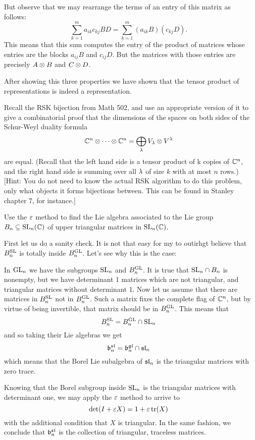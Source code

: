 \documentclass[12pt]{memoir}
\begin{document}
\begin{ptcbr}
    But observe that we may rearrange the terms of an entry of this matrix as follows: 
    $$\sum_{k=1}^{m}a_{ik}c_{kj}BD=\sum_{k=1}^{m}(a_{ik}B)(c_{kj}D).$$
    This means that this sum computes the entry of the product of matrices whose entries are the blocks $a_{ij}B$ and $c_{ij}D$. But the matrices with those entries are precisely $A\otimes B$ and $C\otimes D$.\par
    After showing this three properties we have shown that the tensor product of representations is indeed a representation. 
\end{ptcbr}
\begin{Ej}
    Recall the RSK bijection from Math 502, and use an appropriate version of it to give a combinatorial proof that the dimensions of the spaces on both sides of the Schur-Weyl duality formula
    $$\mathbb{C}^n\otimes\cdots\otimes\mathbb{C}^n=\bigoplus_\lambda V_\lambda\otimes V^\lambda$$
    are equal. (Recall that the left hand side is a tensor product of k copies of $\mathbb{C}^n$, and the right hand side
    is summing over all $\lambda$ of size $k$ with at most $n$ rows.)
    [Hint: You do not need to know the actual RSK algorithm to do this problem, only what objects it
    forms bijections between. This can be found in Stanley chapter 7, for instance.]
\end{Ej}

\begin{Ej}
    Use the $\varepsilon$ method to ﬁnd the Lie algebra associated to the Lie group $B_n\subseteq\mathrm{SL}_n(\mathbb{C})$ of upper
triangular matrices in $\mathrm{SL}_n(\mathbb{C})$.
\end{Ej}

\begin{ptcbr}
    First let us do a sanity check. It is not that easy for my to outirhgt believe that $B^{\mathrm{SL}}_n$ is totally inside $B^{\mathrm{GL}}_n$. Let's see why this is the case:\par
    In $\mathrm{GL}_n$ we have the subgroups $\mathrm{SL}_n$ and $B_n^{\mathrm{GL}}$. It is true that $\mathrm{SL}_n\cap B_n$ is nonempty, but we have determinant 1 matrices which are not triangular, and triangular matrices without determinant 1. Now let us assume that there are matrices in $B^{\mathrm{SL}}_n$ not in $B^{\mathrm{GL}}_n$. Such a matrix fixes the complete flag of $\mathbb{C}^n$, but by virtue of being invertible, that matrix should be in $B^{\mathrm{GL}}_n$. This means that 
    $$B^{\mathrm{SL}}_n=B^{\mathrm{GL}}_n\cap\mathrm{SL}_n$$ 
    and so taking their Lie algebras we get 
    $$\mathfrak{b}^{\mathfrak{sl}}_n=\mathfrak{b}^{\mathfrak{gl}}_n\cap\mathfrak{sl}_n$$
    which means that the Borel Lie subalgebra of $\mathfrak{sl}_n$ is the triangular matrices with zero trace.\par
    Knowing that the Borel subgroup inside $\mathrm{SL}_n$ is the triangular matrices with determinant one, we may apply the $\varepsilon$ method to arrive to 
    $$\det(I+\varepsilon X)=1+\varepsilon\tr(X)$$
    with the additional condition that $X$ is triangular. In the same fashion, we conclude that $\mathfrak{b}^{\mathfrak{sl}}_n$ is the collection of triangular, traceless matrices.
\end{ptcbr}
\end{document}
